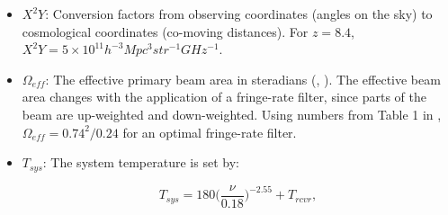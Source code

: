 \documentclass[preprint2,numberedappendix,tighten]{aastex6}  %
\begin{document}
\begin{itemize}
\item $X^{2}Y$: Conversion factors from observing coordinates (angles on the sky) to cosmological coordinates (co-moving distances). For $z=8.4$, $X^{2}Y = 5 \times 10^{11} h^{-3} Mpc^{3} str^{-1} GHz^{-1}$.
\item $\Omega_{eff}$: The effective primary beam area in steradians (\citealt{parsons_et_al2010}, \citealt{pober_et_al2012}). The effective beam area changes with the application of a fringe-rate filter, since parts of the beam are up-weighted and down-weighted. Using numbers from Table 1 in \citet{parsons_et_al2016}, $\Omega_{eff} = 0.74^{2}/0.24$ for an optimal fringe-rate filter. 
\item $T_{sys}$: The system temperature is set by:

\begin{equation}
\label{eq:sys}
T_{sys} = 180\Big(\frac{\nu}{0.18}\Big)^{-2.55} + T_{rcvr},
\end{equation}


\end{itemize}
\end{document}
